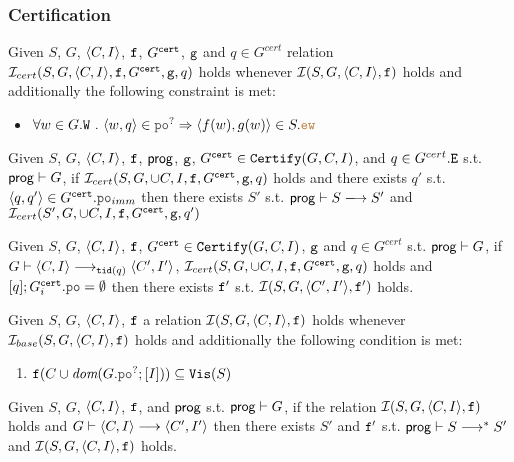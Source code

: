 \documentclass[12pt]{article}
\begin{document}
\subsubsection{Certification}

\begin{definition}
  Given $S$, $G$, $\langle C, I \rangle$, ${\mathtt{f}}$, $G^{{\mathtt{cert}}}$, ${\mathtt{g}}$ and $q \in G^{cert}$
  relation $\mathcal{I}_{cert}(S, G, \langle C, I \rangle, {\mathtt{f}}, G^{{\mathtt{cert}}}, {\mathtt{g}}, q)$ holds 
  whenever $\mathcal{I}(S, G, \langle C, I \rangle, {\mathtt{f}})$ holds and additionally 
  the following constraint is met:
  \begin{itemize}
    \item $\forall{w \in G.\lW} ~.~ \tup{w, q} \in \lPO^? \Rightarrow 
      \tup{f(w), g(w)} \in S.\lEW$
  \end{itemize}
\end{definition}

\begin{lemma}
  Given $S$, $G$, $\langle C, I \rangle$, ${\mathtt{f}}$, $\mathsf{prog}$,
  ${\mathtt{g}}$, $G^{{\mathtt{cert}}} \in {\mathtt{Certify}}(G, C, I)$, and $q \in G^{cert}.{\mathtt{E}}$
  s.t. $\mathsf{prog} \vdash G$,
  if $\mathcal{I}_{cert}(S, G, \cup{C, I}, {\mathtt{f}}, G^{{\mathtt{cert}}}, {\mathtt{g}}, q)$ holds 
  and there exists $q'$ s.t. $\tup{q, q'} \in G^{\cert}.\lPO_{imm}$
  then there exists $S'$ s.t. $\Prog \vdash S \esstep{} S'$ and
  $\mathcal{I}_{cert}(S', G, \cup{C, I}, {\mathtt{f}}, G^{{\mathtt{cert}}}, {\mathtt{g}}, q')$
\end{lemma}

\begin{lemma}
  Given $S$, $G$, $\langle C, I \rangle$, ${\mathtt{f}}$, 
  $G^{{\mathtt{cert}}} \in {\mathtt{Certify}}(G, C, I)$, ${\mathtt{g}}$ and $q \in G^{cert}$
  s.t. $\mathsf{prog} \vdash G$, if $G \vdash \langle C, I \rangle \longrightarrow_{{\mathtt{tid}}(q)} \langle C', I' \rangle$, 
  $\mathcal{I}_{cert}(S, G, \cup{C, I}, {\mathtt{f}}, G^{{\mathtt{cert}}}, {\mathtt{g}}, q)$ holds 
  and $[q];G_{i}^{\cert}.\lPO = \emptyset$ then there exists
  ${\mathtt{f}}'$ s.t. $\mathcal{I}(S, G, \langle C', I' \rangle, {\mathtt{f}}')$ holds.
\end{lemma}

\begin{definition}
  \label{def:sim-rel}
  Given $S$, $G$, $\langle C, I \rangle$, ${\mathtt{f}}$ a relation $\mathcal{I}(S, G, \langle C, I \rangle, {\mathtt{f}})$ holds
  whenever $\mathcal{I}_{base}(S, G, \langle C, I \rangle, {\mathtt{f}})$ holds and additionally
  the following condition is met:
  \begin{enumerate}[label=\textbf{S.\arabic*},start=8]
    \item \label{item:sim-vis}
       $\f(C \cup \dom{G.\lPO^?;[I]}) \subseteq \lVIS(S)$
  \end{enumerate}
\end{definition}

\begin{lemma}
  \label{lemma:sim-step}
  Given $S$, $G$, $\langle C, I \rangle$, ${\mathtt{f}}$, and $\mathsf{prog}$ 
  s.t. $\mathsf{prog} \vdash G$,
  if the relation $\mathcal{I}(S, G, \langle C, I \rangle, {\mathtt{f}})$ holds
  and $G \vdash \langle C, I \rangle \longrightarrow \langle C', I' \rangle$
  then there exists $S'$ and ${\mathtt{f}}'$ s.t.
  $\mathsf{prog} \vdash S \longrightarrow^* S'$ and
  $\mathcal{I}(S, G, \langle C, I \rangle, {\mathtt{f}})$ holds.
\end{lemma}
\end{document}
